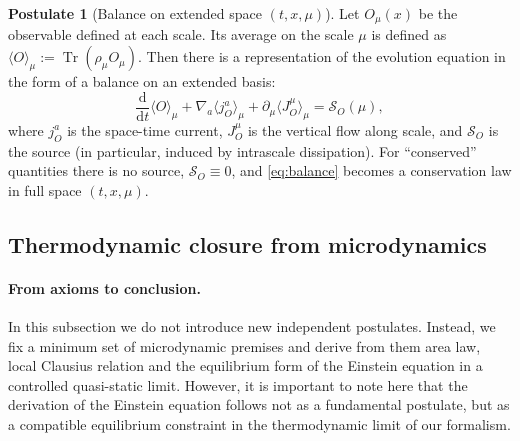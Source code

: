 \documentclass[11pt,a4paper]{article}
\DeclareMathOperator{\Tr}{Tr}
\newcommand{\dd}{\mathrm{d}}
\theoremstyle{definition}
\newtheorem{axiom}{Postulate}[section]
\theoremstyle{plain}
\theoremstyle{remark}
\begin{document}
\begin{axiom}[Balance on extended space $(t,x,\mu)$]\label{ax:balance}
Let $O_\mu(x)$ be the observable defined at each scale.
Its average on the scale $\mu$ is defined as $\langle O\rangle_\mu := \Tr(\rho_\mu O_\mu)$.
Then there is a representation of the evolution equation in the form of a balance on an extended basis:
\begin{equation}\label{eq:balance}
\frac{\dd}{\dd t}\langle O\rangle_\mu
+
\nabla_a\langle j_O^a\rangle_\mu
+
\partial_\mu\langle J_O^\mu\rangle_\mu
=
\mathcal S_O(\mu),
\end{equation}
where $j_O^a$ is the space-time current, $J_O^\mu$ is the vertical flow along scale,
and $\mathcal S_O$ is the source (in particular, induced by intrascale dissipation).
For “conserved” quantities there is no source, $\mathcal S_O\equiv 0$, and \eqref{eq:balance} becomes a conservation law
in full space $(t,x,\mu)$.
\end{axiom}

\subsection{Thermodynamic closure from microdynamics}
\label{sec:axioms:thermo}

\paragraph{From axioms to conclusion.}
In this subsection we do not introduce new independent postulates.
Instead, we fix a minimum set of microdynamic premises and derive from them
area law, local Clausius relation \cite{Callen1985Thermostatistics} and the equilibrium form of the Einstein equation
in a controlled quasi-static limit. However, it is important to note here that the derivation of the Einstein equation follows not as a fundamental postulate, but as a compatible equilibrium constraint in the thermodynamic limit of our formalism.
\end{document}
